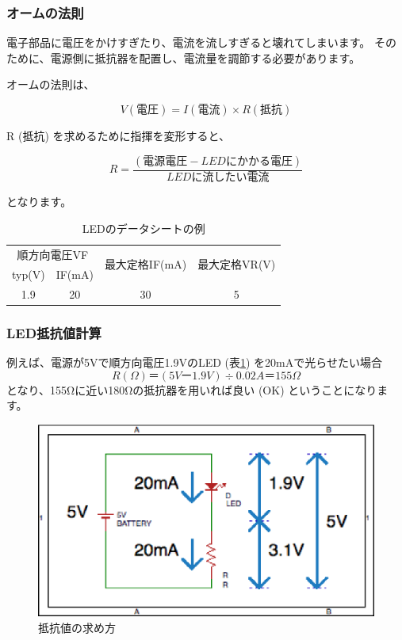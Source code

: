 \documentclass[11pt,a4paper]{jarticle}
\begin{document}
\subsubsection*{オームの法則}
電子部品に電圧をかけすぎたり、電流を流しすぎると壊れてしまいます。
そのために、電源側に抵抗器を配置し、電流量を調節する必要があります。

オームの法則は、

\begin{equation}
 V (電圧) = I (電流) \times R (抵抗)
\end{equation}

R (抵抗) を求めるために指揮を変形すると、

\begin{equation}
 R = \frac{(電源電圧 - LEDにかかる電圧)}{LEDに流したい電流}
\end{equation}

となります。

\begin{table}[htb]
 \begin{center}
 \caption{LEDのデータシートの例}
 \label{tb:dataSheet}
  \begin{tabular}{|c|c|c|c|} \hline
   \multicolumn{2}{|c|}{順方向電圧VF} & \multirow{2}{*}{最大定格IF(mA)} & \multirow{2}{*}{最大定格VR(V)} \\ \cline{1-2}
   typ(V) & IF(mA) & &\\ \hline
   1.9 & 20 & 30 & 5 \\ \hline
  \end{tabular}
 \end{center}
\end{table}

\subsubsection*{LED抵抗値計算}
例えば、電源が5Vで順方向電圧1.9VのLED (表\ref{tb:dataSheet}) を20mAで光らせたい場合
\begin{equation}
R (Ω) ＝ (5Vー1.9V) ÷ 0.02A ＝ 155Ω
\end{equation}
となり、155Ωに近い180Ωの抵抗器を用いれば良い (OK) ということになります。

\begin{figure}[htb]
  \centering
  \includegraphics[width=0.5\columnwidth]{img/method_for_calculating_resistance_value.eps}
  \caption{抵抗値の求め方}
  \label{figure:method_for_calculating_resistance_value}
\end{figure}
\end{document}

